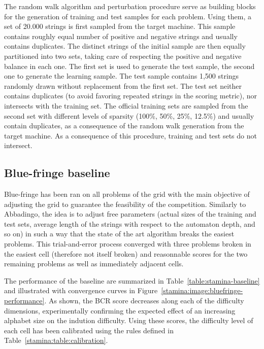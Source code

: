The random walk algorithm and perturbation procedure serve as building blocks for the generation of training and test samples for each problem. Using them, a set of 20.000 strings is first sampled from the target machine. This sample contains roughly equal number of positive and negative strings and usually contains duplicates. The distinct strings of the initial sample are then equally partitioned into two sets, taking care of respecting the positive and negative balance in each one. The first set is used to generate the test sample, the second one to generate the learning sample. The test sample contains 1,500 strings randomly drawn without replacement from the first set. The test set neither contains duplicates (to avoid favoring repeated strings in the scoring metric), nor intersects with the training set. The official training sets are sampled from the second set with different levels of sparsity (100\%, 50\%, 25\%, 12.5\%) and usually contain duplicates, as a consequence of the random walk generation from the target machine. As a consequence of this procedure, training and test sets do not intersect.

\subsection{Blue-fringe baseline\label{subsection:stamina-baseline}}

Blue-fringe has been ran on all problems of the grid with the main objective of adjusting the grid to guarantee the feasibility of the competition. Similarly to Abbadingo, the idea is to adjust free parameters (actual sizes of the training and test sets, average length of the strings with respect to the automaton depth, and so on) in such a way that the state of the art algorithm breaks the easiest problems. This trial-and-error process converged with three problems broken in the easiest cell (therefore not itself broken) and reasonnable scores for the two remaining problems as well as  immediately adjacent cells. 

The performance of the baseline are summarized in Table~\ref{table:stamina-baseline} and illustrated with convergence curves in Figure~\ref{stamina:image:bluefringe-performance}. As shown, the BCR score decreases along each of the difficulty dimensions, experimentally confirming the expected effect of an increasing alphabet size on the indution difficulty. Using these scores, the difficulty level of each cell has been calibrated using the rules defined in Table~\ref{stamina:table:calibration}.

